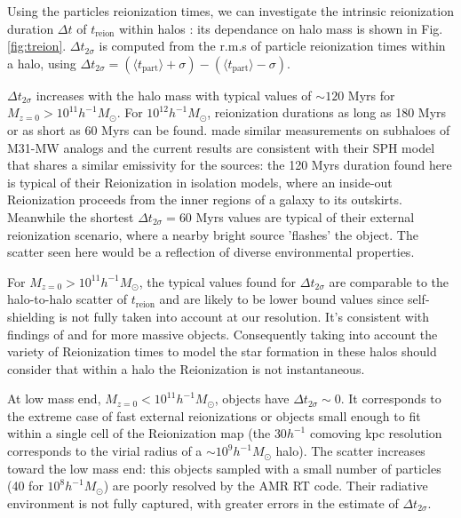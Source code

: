 \documentclass[twocolumn]{aastex61}
\begin{document}
%

Using the particles reionization times, we can investigate the intrinsic reionization duration $\Delta t$ of $t_\mathrm{reion}$ within halos : its dependance on halo mass is shown in Fig. \ref{fig:treion}. $\Delta t_{2\sigma}$ is computed from the r.m.s of particle reionization times within a halo, using $\Delta t_{2\sigma}=(\langle t_\mathrm{part}\rangle+\sigma)-(\langle t_\mathrm{part}\rangle-\sigma)$. 

$\Delta t_{2\sigma}$ increases with the halo mass with typical values of $\sim 120$ Myrs for $M_{z=0}>10^{11} h^{-1} M_\odot$. For $10^{12} h^{-1} M_\odot$, reionization durations as long as 180 Myrs or as short as 60 Myrs can be found. \citet{OCV14} made similar measurements on subhaloes of M31-MW analogs and the current results are consistent with their SPH model that shares a similar emissivity for the sources: the 120 Myrs duration found here is typical of their Reionization in isolation models, where an inside-out Reionization proceeds from the inner regions of a galaxy to its outskirts. Meanwhile the shortest $\Delta t_{2\sigma}=60$ Myrs values are typical of their external reionization scenario, where a nearby bright source 'flashes' the object. The scatter seen here would be a reflection of diverse environmental properties.

For $M_{z=0}>10^{11}h^{-1} M_\odot$, the typical values found for $\Delta t_{2\sigma}$ are comparable to the halo-to-halo scatter of $t_\mathrm{reion}$ and are likely to be lower bound values since self-shielding is not fully taken into account at our resolution. It's consistent with findings of \citet{ALV9} and \citet{LI14} for more massive objects. Consequently taking into account the variety of Reionization times to model the star formation in these halos should consider that within a halo the Reionization is not instantaneous. 

At low mass end, $M_{z=0}<10^{11}h^{-1} M_\odot$, objects have $\Delta t_{2\sigma}\sim 0$. It corresponds to the extreme case of fast external reionizations or objects small enough to fit within a single cell of the Reionization map (the $30 h^{-1}$ comoving kpc resolution corresponds to the virial radius of a $\sim 10^9 h^{-1} M_\odot$ halo). The scatter increases toward the low mass end: this objects sampled with a small number of particles (40 for $10^8 h^{-1} M_\odot$) are poorly resolved by the AMR RT code. Their radiative environment is not fully captured, with greater errors in the estimate of $\Delta t_{2\sigma}$.
\end{document}
